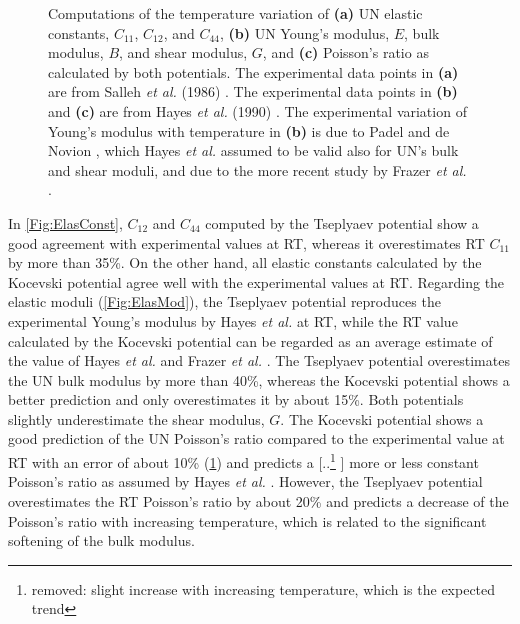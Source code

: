 \documentclass[preprint, 12pt]{elsarticle}
\providecommand{\DIFaddtex}[1]{{\protect\color{blue} \sf #1}} %
\providecommand{\DIFdeltex}[1]{{\protect\color{red} [..\footnote{removed: #1} ]}} %
\providecommand{\DIFaddbegin}{} %
\providecommand{\DIFaddend}{} %
\providecommand{\DIFdelbegin}{} %
\providecommand{\DIFdelend}{} %
\providecommand{\DIFadd}[1]{\texorpdfstring{\DIFaddtex{#1}}{#1}} %
\providecommand{\DIFdel}[1]{\texorpdfstring{\DIFdeltex{#1}}{}} %
\newcommand{\DIFscaledelfig}{0.5}
\newlength{\DIFdelgraphicswidth} %
\newlength{\DIFdelgraphicsheight} %
\newcommand{\DIFaddincludegraphics}[2][]{{\color{blue}\fbox{\DIFOincludegraphics[#1]{#2}}}} %
\newcommand{\DIFdelincludegraphics}[2][]{%
\sbox{\DIFdelgraphicsbox}{\DIFOincludegraphics[#1]{#2}}%
\settoboxwidth{\DIFdelgraphicswidth}{\DIFdelgraphicsbox} %
\settoboxtotalheight{\DIFdelgraphicsheight}{\DIFdelgraphicsbox} %
\scalebox{\DIFscaledelfig}{%
\parbox[b]{\DIFdelgraphicswidth}{\usebox{\DIFdelgraphicsbox}\\[-\baselineskip] \rule{\DIFdelgraphicswidth}{0em}}\llap{\resizebox{\DIFdelgraphicswidth}{\DIFdelgraphicsheight}{%
\setlength{\unitlength}{\DIFdelgraphicswidth}%
\begin{picture}(1,1)%
\thicklines\linethickness{2pt} %
{\color[rgb]{1,0,0}\put(0,0){\framebox(1,1){}}}%
{\color[rgb]{1,0,0}\put(0,0){\line( 1,1){1}}}%
{\color[rgb]{1,0,0}\put(0,1){\line(1,-1){1}}}%
\end{picture}%
}\hspace*{3pt}}} %
} %
\DeclareRobustCommand{\DIFaddbegin}{\DIFOaddbegin \let\includegraphics\DIFaddincludegraphics} %
\DeclareRobustCommand{\DIFaddend}{\DIFOaddend \let\includegraphics\DIFOincludegraphics} %
\DeclareRobustCommand{\DIFdelbegin}{\DIFOdelbegin \let\includegraphics\DIFdelincludegraphics} %
\DeclareRobustCommand{\DIFdelend}{\DIFOaddend \let\includegraphics\DIFOincludegraphics} %
\begin{document}
\begin{figure}[h!]
\begin{subfigure}{0.45\textwidth}
    \caption{}
    \label{Fig:Poisson}
\end{subfigure}
\caption{Computations of the temperature variation of \textbf{(a)} UN elastic constants, $C_{11}$, $C_{12}$, and $C_{44}$, \textbf{(b)} UN Young's modulus, $E$, bulk modulus, $B$, and shear modulus, $G$, and \textbf{(c)} Poisson's ratio as calculated by both potentials. The experimental data points in \textbf{(a)} are from Salleh \textit{et al.} (1986) \cite{Salleh1986}. The experimental data points in \textbf{(b)} and \textbf{(c)} are from Hayes \textit{et al.} (1990) \cite{Hayes1990II}. The experimental variation of Young's modulus with temperature in \textbf{(b)} is due to Padel and de Novion \cite{Padel1969}, which Hayes \textit{et al.} assumed to be valid also for UN's bulk and shear moduli, and due to the more recent study by Frazer \textit{et al.} \cite{Frazer2021}.}
\label{Fig:EC}
\end{figure}

In \cref{Fig:ElasConst}, $C_{12}$ and $C_{44}$ computed by the Tseplyaev potential show a good agreement with experimental values at RT, whereas it overestimates RT $C_{11}$ by more than 35\%. On the other hand, all elastic constants calculated by the Kocevski potential agree well with the experimental values at RT. Regarding the elastic moduli (\cref{Fig:ElasMod}), the Tseplyaev potential reproduces the experimental Young's modulus by Hayes \textit{et al.} \cite{Hayes1990II} at RT, while the RT value calculated by the Kocevski potential can be regarded as an average estimate of the value of Hayes \textit{et al.} \cite{Hayes1990II} and Frazer \textit{et al.} \cite{Frazer2021}. The Tseplyaev potential overestimates the UN bulk modulus by more than 40\%, whereas the Kocevski potential shows a better prediction and only overestimates it by about 15\%. Both potentials slightly underestimate the shear modulus, $G$. The Kocevski potential shows a good prediction of the UN Poisson's ratio compared to the experimental value at RT \DIFaddbegin \DIFadd{with an error of about 10\% }\DIFaddend (\cref{Fig:Poisson}) and predicts a \DIFdelbegin \DIFdel{slight increase with increasing temperature, which is the expected trend}\DIFdelend \DIFaddbegin \DIFadd{more or less constant Poisson's ratio as assumed by Hayes \textit{et al.} \cite{Hayes1990II}}\DIFaddend . However, the Tseplyaev potential \DIFaddbegin \DIFadd{overestimates the RT Poisson's ratio by about 20\% and }\DIFaddend predicts a decrease of the Poisson's ratio with increasing temperature, \DIFaddbegin \DIFadd{which is }\DIFaddend related to the significant softening of the bulk modulus.
\end{document}

